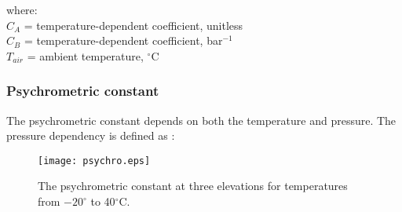 \noindent where: \\
\indent $C_A$ = temperature-dependent coefficient, unitless\\
\indent $C_B$ = temperature-dependent coefficient, bar$^{-1}$\\
\indent $T_{air}$ = ambient temperature, $^{\circ}$C\\

\subsubsection{Psychrometric constant}
\label{sec:psychro}
The psychrometric constant depends on both the temperature and pressure. 
The pressure dependency is defined as \parencite[Eq. 8]{allen98}:

\begin{figure}[ht!]
    \texttt{[image: psychro.eps]}
    \caption{The psychrometric constant at three elevations for temperatures from $-20^{\circ}$ to 40$^{\circ}$C.}
    \label{fig:psychro}
\end{figure}

